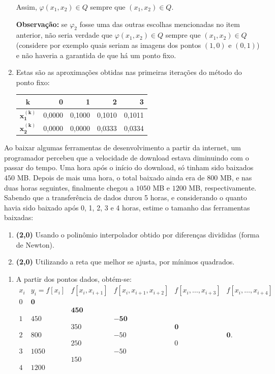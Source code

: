 \documentclass[12pt,a4paper]{article}
\begin{document}
\begin{ExerciseList}
\begin{enumerate}
Assim, $\varphi(x_1, x_2) \in Q$ sempre que $(x_1, x_2) \in Q$.

\textbf{Observação:} se $\varphi_2$ fosse uma das outras escolhas mencionadas no item anterior, não seria verdade que $\varphi(x_1, x_2) \in Q$ sempre que $(x_1, x_2) \in Q$ (considere por exemplo quais seriam as imagens dos pontos $(1,0)$ e $(0,1)$) e não haveria a garantida de que há um ponto fixo.
\item Estas são as aproximações obtidas nas primeiras iterações do método do ponto fixo:
\begin{center}
\begin{tabular}{|c|r|r|r|r|}
\hline
$\boldsymbol{k}$     & 0 & 1 & 2 & 3 \\
\hline
$\boldsymbol{x_1^{(k)}}$ & 0,0000 & 0,1000 & 0,1010 & 0,1011\\
\hline
$\boldsymbol{x_2^{(k)}}$ & 0,0000 & 0,0000 & 0,0333 & 0,0334\\
\hline
\end{tabular}
\end{center}
\end{enumerate}

\Exercise%
Ao baixar algumas ferramentas de desenvolvimento a partir da internet, um programador percebeu que a velocidade de download estava diminuindo com o passar do tempo. Uma hora após o início do download, só tinham sido baixados $450$ MB. Depois de mais uma hora, o total baixado ainda era de $800$ MB, e nas duas horas seguintes, finalmente chegou a $1050$ MB e $1200$ MB, respectivamente. Sabendo que a transferência de dados durou 5 horas, e considerando o quanto havia sido baixado após 0, 1, 2, 3 e  4 horas, estime o tamanho das ferramentas baixadas:
\begin{enumerate}
\item \textbf{(2,0)} Usando o polinômio interpolador obtido por diferenças divididas (forma de Newton).
\item \textbf{(2,0)} Utilizando a reta que melhor se ajusta, por mínimos quadrados.
\end{enumerate}
\Answer
\begin{enumerate}
\item A partir dos pontos dados, obtém-se:
\[
\begin{array}{ccccccc}
x_i
& y_i=f[x_i]
& f[x_i,x_{i+1}]
& f[x_i,x_{i+1},x_{i+2}]
& f[x_i,\ldots,x_{i+3}]
& f[x_i,\ldots,x_{i+4}]\\
0 & \mathbf{0} \\
  & & \mathbf{450} \\
1 & 450 & & \mathbf{-50} \\
  & & 350 & & \mathbf{0} \\
2 & 800 & & -50 & & \mathbf{0}. \\
  & & 250 & & 0 \\
3 & 1050 & & -50\\
  & & 150\\
4 & 1200
\end{array}
\]


\end{enumerate}
\end{ExerciseList}
\end{document}
